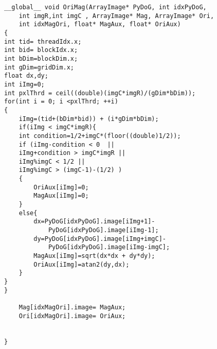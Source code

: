 \begin{small}
\begin{lstlisting}
__global__ void OriMag(ArrayImage* PyDoG, int idxPyDoG,
	int imgR,int imgC , ArrayImage* Mag, ArrayImage* Ori,
	int idxMagOri, float* MagAux, float* OriAux) 
{
int tid= threadIdx.x;
int bid= blockIdx.x;
int bDim=blockDim.x;
int gDim=gridDim.x;
float dx,dy;
int iImg=0;
int pxlThrd = ceil((double)(imgC*imgR)/(gDim*bDim)); 
for(int i = 0; i <pxlThrd; ++i)
{
	iImg=(tid+(bDim*bid)) + (i*gDim*bDim); 
	if(iImg < imgC*imgR){
	int condition=1/2+imgC*(floor((double)1/2));
	if (iImg-condition < 0  ||										
	iImg+condition > imgC*imgR ||								
	iImg%imgC < 1/2 ||										
	iImg%imgC > (imgC-1)-(1/2) )							
	{                  
		OriAux[iImg]=0;
		MagAux[iImg]=0;
	}
	else{
		dx=PyDoG[idxPyDoG].image[iImg+1]-
			PyDoG[idxPyDoG].image[iImg-1];
		dy=PyDoG[idxPyDoG].image[iImg+imgC]-
			PyDoG[idxPyDoG].image[iImg-imgC];
		MagAux[iImg]=sqrt(dx*dx + dy*dy);
		OriAux[iImg]=atan2(dy,dx);
    }
}
}
	
	Mag[idxMagOri].image= MagAux;
	Ori[idxMagOri].image= OriAux;

	
}
\end{lstlisting}


\end{small}
\pagebreak
